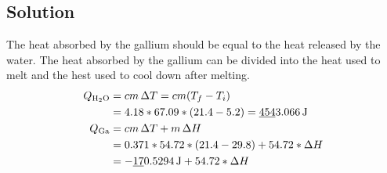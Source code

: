 \documentclass[10pt]{article}
\newcommand{\U}[1]{\underline{#1}}
\begin{document}
        \subsection{Solution}
            The heat absorbed by the gallium should be equal to the heat released by the water.
            The heat absorbed by the gallium can be divided into the heat used to melt and the hest used to cool down after melting.
            \begin{gather}
                \begin{align}
                    Q_{\rm H_2O}    &=  cm\,\Delta T
                        =   cm(T_f - T_i)\\
                        &=  4.18 * 67.09 * (21.4 - 5.2)
                        =   \U{454}3.066\,\unit{\joule}\\
                    Q_{\rm Ga}  &=  cm\,\Delta T + m\,\Delta H\\
                        &=  0.371 * 54.72 * (21.4 - 29.8) + 54.72 * \Delta H\\
                        &=  -\U{17}0.5294\,\unit{\joule} + 54.72 * \Delta H
                \end{align}
            \end{gather}
    
    \pagebreak
    \tableofcontents
\end{document}
